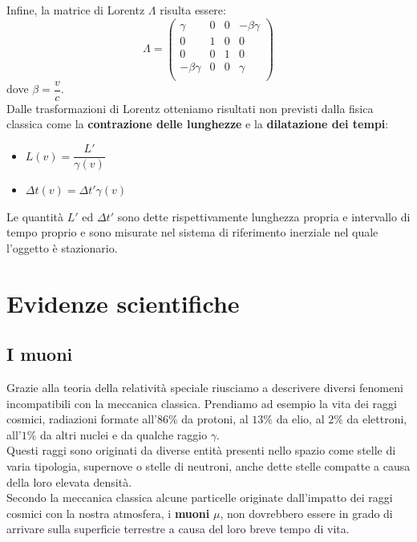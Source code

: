 Infine, la matrice di Lorentz $\Lambda$ risulta essere:
\begin{equation}
    \Lambda =
    \begin{pmatrix}
        \gamma & 0 & 0 & -\beta \gamma  \\
        0 & 1 & 0 & 0 \\
        0 & 0 & 1& 0\\
        -\beta \gamma & 0 & 0 & \gamma \\
    \end{pmatrix}
\end{equation}
dove $\beta = \dfrac{v}{c}$.\\
Dalle trasformazioni di Lorentz otteniamo risultati non previsti dalla fisica classica come la \textbf{contrazione delle lunghezze} e la \textbf{dilatazione dei tempi}:
\begin{itemize}
    \item $L(v) = \dfrac{L'}{\gamma(v)}$
    \item $\Delta t (v) = \Delta t' \gamma (v)$
\end{itemize}
Le quantità $L'$ ed $\Delta t'$ sono dette rispettivamente lunghezza propria e intervallo di tempo proprio e sono misurate nel sistema di riferimento inerziale nel quale l'oggetto è stazionario.
\section{Evidenze scientifiche}
\subsection{I muoni}
Grazie alla teoria della relatività speciale riusciamo a descrivere diversi fenomeni incompatibili con la meccanica classica.
Prendiamo ad esempio la vita dei raggi cosmici, radiazioni formate all'$86\%$ da protoni, al $13\%$ da elio, al $2\%$ da elettroni, all'$1\%$ da altri nuclei e da qualche raggio $\gamma$.\\
Questi raggi sono originati da diverse entità presenti nello spazio come stelle di varia tipologia, supernove o stelle di neutroni, anche dette stelle compatte a causa della loro elevata densità.\\
Secondo la meccanica classica alcune particelle originate dall'impatto dei raggi cosmici con la nostra atmosfera, i \textbf{muoni} $\mu$, non dovrebbero essere in grado di arrivare sulla superficie terrestre a causa del loro breve tempo di vita.


